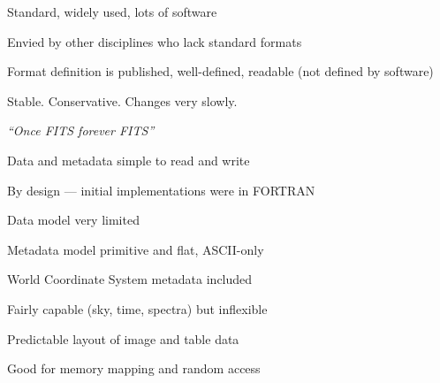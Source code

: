 \documentclass[20pt,landscape]{foils}
\begin{document}
\vspace*{-0.5cm}

\begin{list1}
  \item Standard, widely used, lots of software
\vspace*{-0.2cm}
  \begin{list2}
    \item Envied by other disciplines who lack standard formats
\vspace*{-0.1cm}
  \end{list2}
  \item Format definition is published, well-defined, readable
        (not defined by software)
  \item Stable.  Conservative.  Changes very slowly.
\vspace*{-0.2cm}
  \begin{list2}
    \item {\sl ``Once FITS forever FITS''}
\vspace*{-0.1cm}
  \end{list2}
  \item Data and metadata simple to read and write
\vspace*{-0.2cm}
  \begin{list2}
    \item By design --- initial implementations were in FORTRAN
\vspace*{-0.1cm}
    \item Data model very limited
\vspace*{-0.1cm}
    \item Metadata model primitive and flat, ASCII-only
\vspace*{-0.1cm}
  \end{list2}
  \item World Coordinate System metadata included
\vspace*{-0.2cm}
  \begin{list2}
    \item Fairly capable (sky, time, spectra) but inflexible
\vspace*{-0.1cm}
  \end{list2}
  \item Predictable layout of image and table data
\vspace*{-0.2cm}
  \begin{list2}
    \item Good for memory mapping and random access
\vspace*{-0.1cm}
  \end{list2}

\end{list1}
\end{document}
